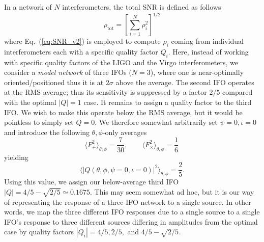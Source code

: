 \documentclass[prd,amsmath,amssymb,aps,floats,amsfonts,notitlepage,superscriptaddress,eqsecnum,nofootinbib,10pt]{revtex4-1}
\newcommand{\f}{\frac}
\newcommand{\be}{\begin{equation}}
\newcommand{\ee}{\end{equation}}
\begin{document}
In a network of $N$ interferometers, the total SNR is defined as follows
%
\be
\rho_\text{tot} = \left[{\sum_{i=1}^N \rho^2_i}\right]^{1/2} \label{eq:SNR_total}
\ee
%
where Eq.~(\ref{eq:SNR_v2}) is employed to compute $\rho_i$ coming from individual interferometers each with a specific quality factor $Q_i$.
Here, instead of working with specific quality factors of the LIGO and the Virgo interferometers, we consider
a \emph{model network} of three IFOs ($N=3$), where one is near-optimally oriented/positioned thus it is at $2\sigma$ above the average.
The second IFO operates at the RMS average; thus its sensitivity is suppressed by a factor $2/5$ compared with the optimal $|Q| =1$ case.
It remains to assign a quality factor to the third IFO. We wish to make this operate below the RMS average, %
but it would be pointless to simply set $Q=0$. We therefore somewhat arbitrarily set $\psi=0,\iota=0$
and introduce the following $\theta,\phi$-only averages
%
\be
 \langle F_+^2\rangle_{\theta,\phi} = \frac{7}{30},\qquad \langle F_\times^2\rangle_{\theta,\phi} = \frac{1}{6}\, 
\ee
yielding
%
\be
\langle |Q(\theta,\phi,\psi=0,\iota=0)|^2 \rangle_{\theta,\phi} = \f{2}{5} \label{eq:RMS_th_phi}.
\ee
Using this value, we assign our below-average third IFO %
$|Q|=4/5-\sqrt{2/5}\simeq 0.1675$.
This may seem somewhat ad hoc, 
but it is our way of representing the response of a three-IFO network to a single source. In other words, we map the three different IFO responses due to a single source to a single IFO's response to three different sources differing in amplitudes 
from the optimal case by quality factors $|Q_i|= 4/5,2/5,$ and $4/5-\sqrt{2/5}$.
\end{document}
